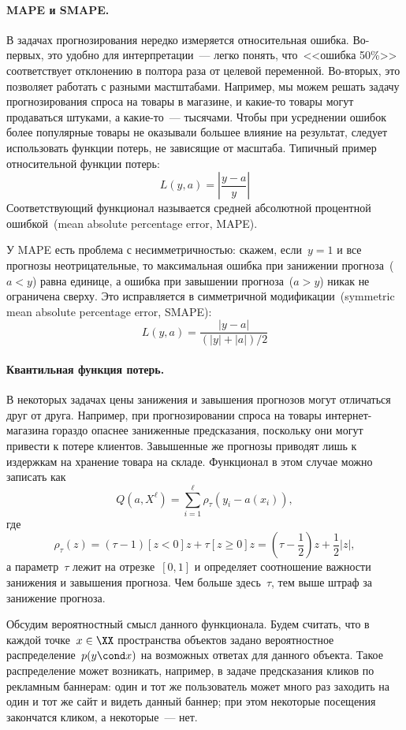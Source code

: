 \documentclass[12pt,fleqn]{article}
\begin{document}
\paragraph{MAPE и SMAPE.}

В задачах прогнозирования нередко измеряется относительная ошибка.
Во-первых, это удобно для интерпретации~--- легко понять, что~<<ошибка 50\%>>
соответствует отклонению в полтора раза от целевой переменной.
Во-вторых, это позволяет работать с разными мастштабами.
Например, мы можем решать задачу прогнозирования спроса на товары в магазине,
и какие-то товары могут продаваться штуками, а какие-то~--- тысячами.
Чтобы при усреднении ошибок более популярные товары не оказывали
большее влияние на результат, следует использовать функции потерь, не зависящие от масштаба.
Типичный пример относительной функции потерь:
\[
    L(y, a) = \left| \frac{y - a}{y} \right|
\]
Соответствующий функционал называется средней абсолютной процентной ошибкой~(mean
absolute percentage error, MAPE).

У MAPE есть проблема с несимметричностью: скажем, если~$y = 1$ и все прогнозы неотрицательные,
то максимальная ошибка при занижении прогноза~($a < y$) равна единице, а ошибка при
завышении прогноза~($a > y$) никак не ограничена сверху.
Это исправляется в симметричной модификации~(symmetric mean absolute percentage error, SMAPE):
\[
    L(y, a) = \frac{|y - a|}{(|y| + |a|) / 2}
\]

\paragraph{Квантильная функция потерь.}

В некоторых задачах цены занижения и завышения прогнозов могут отличаться друг от друга.
Например, при прогнозировании спроса на товары интернет-магазина гораздо опаснее заниженные
предсказания, поскольку они могут привести к потере клиентов.
Завышенные же прогнозы приводят лишь к издержкам на хранение товара на складе.
Функционал в этом случае можно записать как
\[
    Q(a, X^\ell)
    =
    \sum_{i = 1}^{\ell}
        \rho_\tau(y_i - a(x_i)),
\]
где
\[
    \rho_\tau(z)
    =
    (\tau - 1) [z < 0] z
    +
    \tau [z \geq 0] z
    =
    (\tau - \frac{1}{2})z + \frac{1}{2} |z|,
\]
а параметр~$\tau$ лежит на отрезке~$[0, 1]$ и определяет
соотношение важности занижения и завышения прогноза.
Чем больше здесь~$\tau$, тем выше штраф за занижение прогноза.

Обсудим вероятностный смысл данного функционала.
Будем считать, что в каждой точке~$x \in \XX$ пространства объектов
задано вероятностное распределение~$p(y \cond x)$ на возможных ответах для данного объекта.
Такое распределение может возникать, например, в задаче предсказания кликов по рекламным баннерам:
один и тот же пользователь может много раз заходить на один и тот же сайт и видеть данный баннер;
при этом некоторые посещения закончатся кликом, а некоторые~--- нет.
\end{document}
